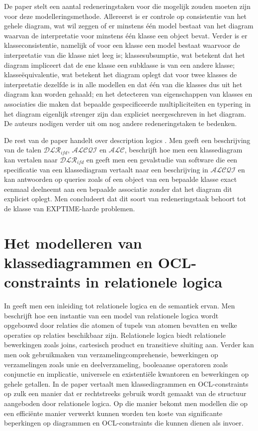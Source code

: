 De paper stelt een aantal redeneringstaken voor die mogelijk zouden moeten zijn voor deze modelleringsmethode. Allereerst is er controle op consistentie van het gehele diagram, wat wil zeggen of er minstens \'e\'en model bestaat van het diagram waarvan de interpretatie voor minstens \'e\'en klasse een object bevat. Verder is er klasseconsistentie, namelijk of voor een klasse een model bestaat waarvoor de interpretatie van die klasse niet leeg is; klassesubsumptie, wat betekent dat het diagram impliceert dat de ene klasse een subklasse is van een andere klasse; klasse\"equivalentie, wat betekent het diagram oplegt dat voor twee klasses de interpretatie dezelfde is in alle modellen en dat \'e\'en van die klasses dus uit het diagram kan worden gehaald; en het detecteren van eigenschappen van klasses en associaties die maken dat bepaalde gespecificeerde multipliciteiten en typering in het diagram eigenlijk strenger zijn dan expliciet neergeschreven in het diagram. De auteurs nodigen verder uit om nog andere redeneringstaken te bedenken.

De rest van de paper handelt over description logics . Men geeft een beschrijving van de talen $\mathcal{DLR}_{ifd}$, $\mathcal{ALCQI}$ en $\mathcal{ALC}$, beschrijft hoe men een klassediagram kan vertalen naar $\mathcal{DLR}_{ifd}$ en geeft men een gevalstudie van software die een specificatie van een klassediagram vertaalt naar een beschrijving in $\mathcal{ALCQI}$ en kan antwoorden op queries zoals of een object van een bepaalde klasse exact eenmaal deelneemt aan een bepaalde associatie zonder dat het diagram dit expliciet oplegt. Men concludeert dat dit soort van redeneringstaak behoort tot de klasse van EXPTIME-harde problemen.

\section{Het modelleren van klassediagrammen en OCL-constraints in relationele logica}
In \cite{KuhlmannMirco2012FUaO} geeft men een inleiding tot relationele logica en de semantiek ervan. Men beschrijft hoe een instantie van een model van relationele logica wordt opgebouwd door relaties die atomen of tupels van atomen bevatten en welke operaties op relaties beschikbaar zijn. Relationele logica biedt relationele bewerkingen zoals joins, cartesisch product en transitieve sluiting aan. Verder kan men ook gebruikmaken van verzamelingcomprehensie, bewerkingen op verzamelingen zoals unie en deelverzameling, booleaanse operatoren zoals conjunctie en implicatie, universele en existenti\"ele kwantoren en bewerkingen op gehele getallen. In de paper vertaalt men klassediagrammen en OCL-constraints  op zulk een manier dat er rechtstreeks gebruik wordt gemaakt van de structuur aangeboden door relationele logica. Op die manier bekomt men modellen die op een effici\"ente manier verwerkt kunnen worden ten koste van significante beperkingen op diagrammen en OCL-constraints die kunnen dienen als invoer.